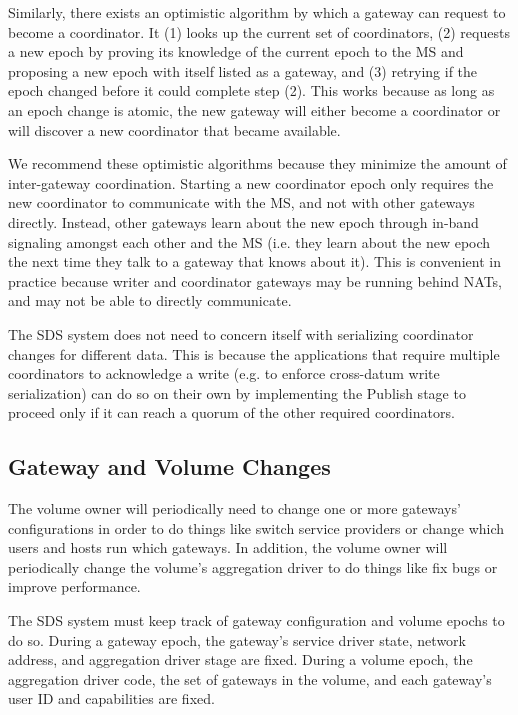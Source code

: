 Similarly, there exists an optimistic algorithm by which a gateway can request
to become a coordinator.  It (1) looks up the current set of coordinators, (2)
requests a new epoch by proving its knowledge of the current epoch to the MS
and proposing a new epoch with itself listed as a gateway, and (3) retrying if the epoch
changed before it could complete step (2).  This works because as long as an epoch change
is atomic, the new gateway will either become a coordinator or will discover a
new coordinator that became available.

We recommend these optimistic algorithms because they minimize the
amount of inter-gateway coordination.  Starting a new coordinator
epoch only requires the new coordinator to communicate with the MS, and not with
other gateways directly.  Instead,
other gateways learn about the new epoch through in-band signaling amongst each
other and the MS (i.e. they learn about the new epoch the next time they talk to
a gateway that knows about it).  This is convenient in practice because writer
and coordinator gateways may be running behind NATs, and may not be able to
directly communicate.

The SDS system does not need to concern itself with serializing coordinator
changes for different data.  This is because the applications that require
multiple coordinators to acknowledge a write (e.g. to enforce cross-datum write
serialization) can do so on their own by implementing the
Publish stage to proceed only if it can reach a quorum of the other required
coordinators.

\subsection{Gateway and Volume Changes}

The volume owner will periodically need to change one or more gateways'
configurations in order to do things like switch service providers or change
which users and hosts run which gateways.  In addition, the volume owner will periodically
change the volume's aggregation driver to do things like fix bugs or improve
performance.

The SDS system must keep track of gateway configuration and volume 
epochs to do so.  During a gateway epoch, the gateway's service
driver state, network address, and aggregation driver stage are fixed.  During
a volume epoch, the aggregation driver code, the set of gateways in the
volume, and each gateway's user ID and capabilities are fixed.

